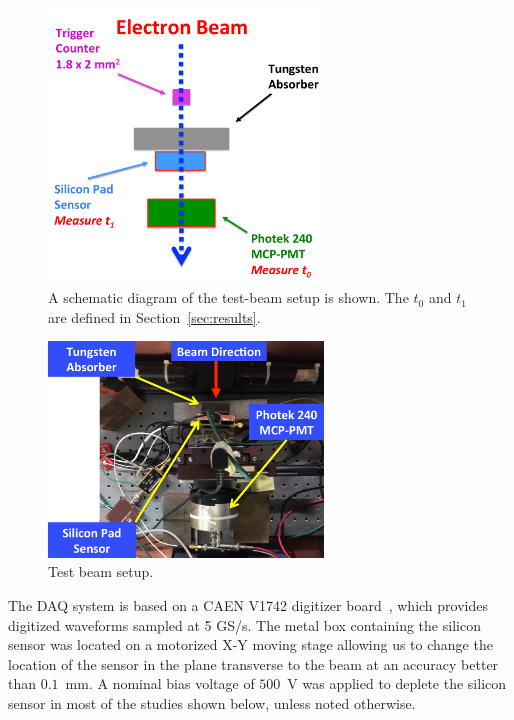 \documentclass[preprint,1p]{elsarticle}
\begin{document}
\begin{figure}[htbp] 
\centering
\includegraphics[width=0.65\textwidth]{plots/BeamSchematicDiagram.pdf} 
\caption{A schematic diagram of the test-beam setup is shown. The $t_0$ and $t_1$ are defined in Section~\ref{sec:results}.} 
\label{fig:BeamSchematicDiagram} 
\end{figure} 

\begin{figure}[htbp] 
\centering
\includegraphics[width=0.65\textwidth]{plots/BeamPhotoDiagram.pdf} 
\caption{Test beam setup.} 
\label{fig:BeamPhotoDiagram} 
\end{figure} 

The DAQ system is based on a CAEN V1742 digitizer board~\cite{CAENDRS}, which
provides digitized waveforms sampled at 5 GS/s. The metal box containing the
silicon sensor was located on a motorized X-Y moving stage allowing us to change
the location of the sensor in the plane transverse to the beam at an accuracy
better than $0.1$~mm. A nominal bias voltage of $500$~V was applied to deplete
the silicon sensor in most of the studies shown below, unless noted otherwise.
\end{document}

